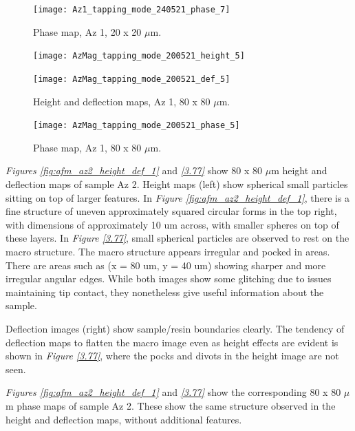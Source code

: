 \begin{figure}[H]
\centering
  \texttt{[image: Az1\_tapping\_mode\_240521\_phase\_7]}
\caption[Phase map, Az 1]{Phase map, Az 1, 20 x 20 $\mu$m.}
\label{fig:afm_az1_phase_7}
\end{figure}


\begin{figure}[H]
\centering
\begin{minipage}{.45\textwidth}
  \centering
  \texttt{[image: AzMag\_tapping\_mode\_200521\_height\_5]}
\end{minipage}
\begin{minipage}{.45\textwidth}
  \centering
  \texttt{[image: AzMag\_tapping\_mode\_200521\_def\_5]}
\end{minipage}
\caption[Height and deflection maps, Az 1]{Height and deflection maps, Az 1, 80 x 80 $\mu$m.}
\label{fig:afm_az1_height_def_8}
\end{figure}

\begin{figure}[H]
\centering
  \texttt{[image: AzMag\_tapping\_mode\_200521\_phase\_5]}
\caption[Phase map, Az 1]{Phase map, Az 1, 80 x 80 $\mu$m.}
\label{fig:afm_az1_phase_8}
\end{figure}




\textit{Figures \ref{fig:afm_az2_height_def_1}} and \textit{\ref{3.77}} show 80 x 80 $\mu$m height and deflection maps of sample Az 2. Height maps (left) show spherical small particles sitting on top of larger features. In \textit{Figure \ref{fig:afm_az2_height_def_1}}, there is a fine structure of uneven approximately squared circular forms in the top right, with dimensions of approximately 10 um across, with smaller spheres on top of these layers. In \textit{Figure \ref{3.77}}, small spherical particles are observed to rest on the macro structure. The macro structure appears irregular and pocked in areas. There are areas such as (x = 80 um, y = 40 um) showing sharper and more irregular angular edges. While both images show some glitching due to issues maintaining tip contact, they nonetheless give useful information about the sample.

Deflection images (right) show sample/resin boundaries clearly. The tendency of deflection maps to flatten the macro image even as height effects are evident is shown in \textit{Figure \ref{3.77}}, where the pocks and divots in the height image are not seen.

\textit{Figures \ref{fig:afm_az2_height_def_1}} and \textit{\ref{3.77}} show the corresponding 80 x 80 $\mu$m phase maps of sample Az 2. These show the same structure observed in the height and deflection maps, without additional features. 

